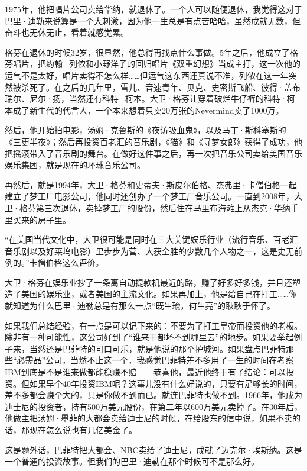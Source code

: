 1975年，他把唱片公司卖给华纳，就退休了。一个人可以随便退休，我觉得这对于巴里·迪勒来说算是一个大刺激，因为他一生总是有点苦哈哈，虽然成就无数，但奋斗也无休无止，看着就感觉累。

格芬在退休的时候32岁，很显然，他总得再找点什么事做。5年之后，他成立了格芬唱片，把约翰·列侬和小野洋子的回归唱片《双重幻想》当成主打，这一次他的运气不是太好，唱片卖得不怎么样\ldots{}\ldots{}但运气这东西还真说不准，列侬在这一年突然被杀死了。在之后的几年里，雪儿、音速青年、贝克、史密斯飞船、彼得·盖布瑞尔、尼尔·扬，当然还有科特·柯本。大卫·格芬让穿着破烂牛仔裤的科特·柯本成了新生代的代言人，一个本来想着只卖20万张的Nevermind卖了1000万。

然后，他开始拍电影，汤姆·克鲁斯的《夜访吸血鬼》，以及马丁·斯科塞斯的《三更半夜》；然后再投资百老汇的音乐剧，《猫》和《寻梦女郎》获得了成功，他把摇滚带入了音乐剧的舞台。在做好这件事之后，再一次把音乐公司卖给美国音乐娱乐集团，就是现在的环球音乐公司。

再然后，就是1994年，大卫·格芬和史蒂夫·斯皮尔伯格、杰弗里·卡僧伯格一起建立了梦工厂电影公司，他同时还创办了一个梦工厂音乐公司。一直到2008年，大卫·格芬第三次退休，卖掉梦工厂的股份，然后住在马里布海滩上从杰克·华纳手里买来的房子里。

``在美国当代文化中，大卫很可能是同时在三大关键娱乐行业（流行音乐、百老汇音乐剧以及好莱坞电影）里步步为营、大获全胜的少数几个人物之一，这是史无前例的。''卡僧伯格这么评价。

大卫·格芬在娱乐业抄了一条离自动提款机最近的路，赚了好多好多钱，并且还塑造了美国的娱乐业，或者美国的主流文化。如果再加上，他是给自己在打工\ldots{}\ldots{}你就知道为什么巴里·迪勒总是有那么一点``既生瑜，何生亮''的耿耿于怀了。

如果我们总结经验，有一点是可以记下来的：不要为了打工皇帝而投资他的老板。除非有一种可能性，这公司好到了``谁来干都坏不到哪里去''的地步。如果要举起例子来，当然还是巴菲特的可口可乐，就是他说的那个护城河。如果盘点巴菲特那些``必需品''公司，当然不止这一个，我感觉巴菲特差不多用了一生的时间在考察IBM到底是不是谁来做都能稳赚不赔------恭喜他，最近他终于有了结论：可以投资。但如果早个40年投资IBM呢？这事儿没有什么好说的，只要有足够长的时间，差不多都会赚个大的，只是你做不到而已。就连巴菲特也做不到。1966年，他成为迪士尼的投资者，持有500万美元股份，在第二年以600万美元卖掉了。在30年后，他做主把汤姆·墨菲的大都会卖给迪士尼的时候，在给股东的信中说，如果不卖的话，那现在怎么说也有几亿美金了。

这是题外话，巴菲特把大都会、NBC卖给了迪士尼，成就了迈克尔·埃斯纳。这是一个普通的投资故事。但我们的巴里·迪勒在那个时候可不是那么好。

